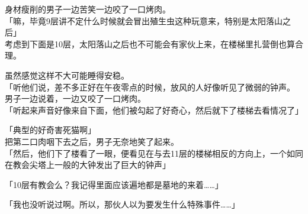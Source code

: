 身材瘦削的男子一边苦笑一边咬了一口烤肉。\\

「嘛，毕竟9层讲不定什么时候就会冒出殖生虫这种玩意来，特别是太阳落山之后」\\

考虑到下面是10层，太阳落山之后也不可能会有家伙上来，在楼梯里扎营倒也算合理。

虽然感觉这样不大可能睡得安稳。\\

「听他们说，差不多正好在午夜零点的时候，放风的人好像听见了微弱的钟声。\\

男子一边说着，一边又咬了一口烤肉。\\

「听起来声音好像来自下面，他们被勾起了好奇心，然后就下了楼梯去看情况了」

「典型的好奇害死猫啊」\\

把第二口肉咽下去之后，男子无奈地笑了起来。\\

「然后，他们下了楼看了一眼，便看见在与去11层的楼梯相反的方向上，一个如同在教会尖塔上一般的大钟发出了巨大的钟声」

「10层有教会么？我记得里面应该遍地都是墓地的来着……」

「我也没听说过啊。所以，那伙人以为要发生什么特殊事件……」

